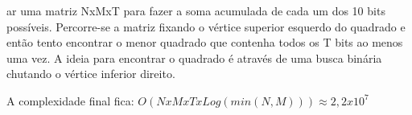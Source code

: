 ar uma matriz NxMxT para fazer a soma acumulada de cada um dos 10 bits possíveis. Percorre-se a matriz fixando o vértice superior esquerdo do quadrado e então tento encontrar o menor quadrado que contenha todos os T bits ao menos uma vez. A ideia para encontrar o quadrado é através de uma busca binária chutando o vértice inferior direito.

A complexidade final fica: $O(NxMxTxLog(min(N, M)))  \approx 2,2 x 10^7$
